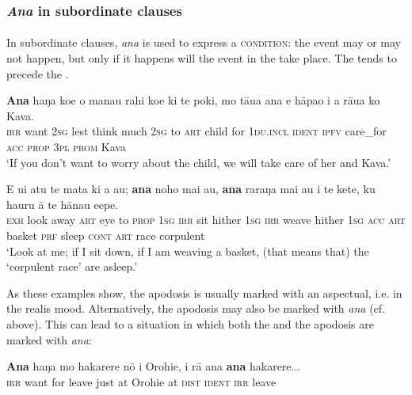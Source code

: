 \subsubsection{\textit{Ana} in subordinate clauses}\label{sec:11.5.2.2}

\paragraph{} In subordinate clauses, \textit{ana} is used to express a \textsc{condition}: the event may or may not happen, but only if it happens will the event in the  take place. The  tends to precede the .

\ea\label{ex:11.179}
\gll \textbf{Ana} haŋa koe {\ꞌ}o mana{\ꞌ}u rahi koe ki te poki, mo tāua {\ꞌ}ana  e hāpa{\ꞌ}o i a rāua ko Kava.\\
\textsc{irr} want \textsc{2sg} lest think much \textsc{2sg} to \textsc{art} child for \textsc{1du.incl} \textsc{ident}  \textsc{ipfv} care\_for \textsc{acc} \textsc{prop} \textsc{3pl} \textsc{prom} Kava\\

\glt 
‘If you don’t want to worry about the child, we will take care of her and Kava.’ \textstyleExampleref{[R229.028]} 
\z

\ea\label{ex:11.180}
\gll E u{\ꞌ}i atu te mata ki a au; \textbf{ana} noho mai au, \textbf{ana} raraŋa mai au i te kete, ku ha{\ꞌ}uru {\ꞌ}ā te hānau {\ꞌ}e{\ꞌ}epe.\\
\textsc{exh} look away \textsc{art} eye to \textsc{prop} \textsc{1sg} \textsc{irr} sit hither \textsc{1sg} \textsc{irr} weave hither \textsc{1sg} \textsc{acc} \textsc{art} basket \textsc{prf} sleep \textsc{cont} \textsc{art} race corpulent\\

\glt
‘Look at me; if I sit down, if I am weaving a basket, (that means that) the ‘corpulent race’ are asleep.’ \textstyleExampleref{[Ley-3-06.025]}
\z

As these examples show, the apodosis is usually marked with an aspectual, i.e. in the realis mood. Alternatively, the apodosis may also be marked with \textit{ana} (cf.  above). This can lead to a situation in which both the  and the apodosis are marked with \textit{ana}:

\ea\label{ex:11.181}
\gll \textbf{Ana} haŋa mo hakarere nō {\ꞌ}i Orohie, {\ꞌ}i rā {\ꞌ}ana \textbf{ana} hakarere... \\
\textsc{irr} want for leave just at Orohie at \textsc{dist} \textsc{ident} \textsc{irr} leave \\


